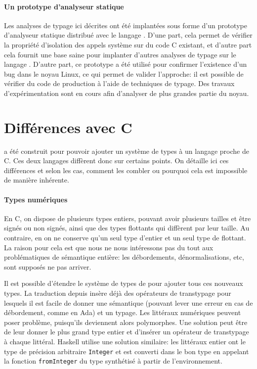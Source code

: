 \paragraph{Un prototype d'analyseur statique}

Les analyses de typage ici décrites ont été implantées sous forme d'un prototype
d'analyseur statique distribué avec le langage \newspeak.
D'une part, cela permet de vérifier la propriété d'isolation des appels système
sur du code C existant, et d'autre part cela fournit une base saine pour
implanter d'autres analyses de typage sur le langage \newspeak.
D'autre part, ce prototype a été utilisé pour confirmer l'existence d'un bug
dans le noyau Linux, ce qui permet de valider l'approche: il est possible de
vérifier du code de production à l'aide de techniques de typage.
Des travaux d'expérimentation sont en cours afin d'analyser de plus grandes
partie du noyau.

\section{Différences avec C}

\langname a été construit pour pouvoir ajouter un système de types à un langage
proche de C. Ces deux langages diffèrent donc sur certains points. On détaille
ici ces différences et selon les cas, comment les combler ou pourquoi cela est
impossible de manière inhérente.

\paragraph{Types numériques}

En C, on dispose de plusieurs types entiers, pouvant avoir plusieurs tailles et
être signés ou non signés, ainsi que des types flottants qui diffèrent par leur
taille. Au contraire, en \langname{} on ne conserve qu'un seul type d'entier et
un seul type de flottant. La raison pour cela est que nous ne nous intéressons
pas du tout aux problématiques de sémantique entière: les débordements,
dénormalisations, etc, sont supposés ne pas arriver.

Il est possible d'étendre le système de types de \langname{} pour ajouter tous
ces nouveaux types. La traduction depuis \newspeak insère déjà des opérateurs de
transtypage pour lesquels il est facile de donner une sémantique (pouvant lever
une erreur en cas de débordement, comme en Ada) et un typage. Les littéraux
numériques peuvent poser problème, puisqu'ils deviennent alors polymorphes. Une
solution peut être de leur donner le plus grand type entier et d'insérer un
opérateur de transtypage à chaque littéral. Haskell utilise une solution
similaire: les littéraux entier ont le type de précision arbitraire
\texttt{Integer} et est converti dans le bon type en appelant la fonction
\texttt{fromInteger} du type synthétisé à partir de l'environnement.

